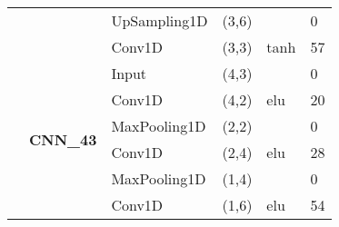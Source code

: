 \begin{table}[H]
\begin{center}
\begin{tabular}{ll|l|l|l|l|}
\multicolumn{1}{|l|}{}                                                                  &                                   & UpSampling1D                       & (3,6)                                &                                          & 0                                           \\ \cline{3-6} 
\multicolumn{1}{|l|}{}                                                                  &                                   & Conv1D                             & (3,3)                                & tanh                                     & 57                                          \\ \cline{2-6} 
\multicolumn{1}{|l|}{}                                                                  & \multirow{8}{*}{\textbf{CNN\_43}} & Input                              & (4,3)                                &                                          & 0                                           \\ \cline{3-6} 
\multicolumn{1}{|l|}{}                                                                  &                                   & Conv1D                             & (4,2)                                & elu                                     & 20                                          \\ \cline{3-6} 
\multicolumn{1}{|l|}{}                                                                  &                                   & MaxPooling1D                       & (2,2)                                &                                          & 0                                           \\ \cline{3-6} 
\multicolumn{1}{|l|}{}                                                                  &                                   & Conv1D                             & (2,4)                                & elu                                     & 28                                          \\ \cline{3-6} 
\multicolumn{1}{|l|}{}                                                                  &                                   & MaxPooling1D                       & (1,4)                                &                                          & 0                                           \\ \cline{3-6} 
\multicolumn{1}{|l|}{}                                                                  &                                   & Conv1D                             & (1,6)                                & elu                                     & 54                                          \\ \cline{3-6} 

\end{tabular}
\end{center}
\end{table}
